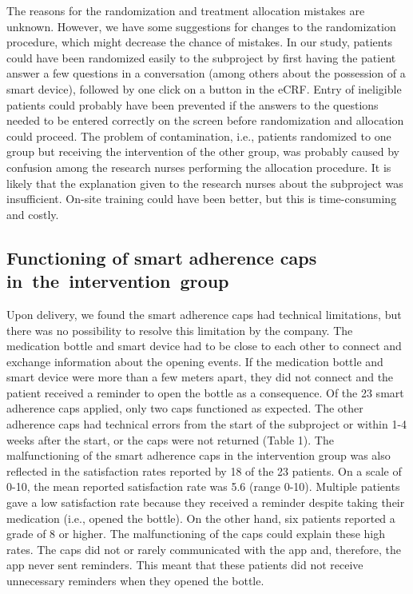 \documentclass[twocolumn, issue, empirical, authordate]{jote-new-article}
\begin{document}
 The reasons for the randomization and treatment allocation mistakes are unknown. However, we have some suggestions for changes to the randomization procedure, which might decrease the chance of mistakes. In our study, patients could have been randomized easily to the subproject by first having the patient answer a few questions in a conversation (among others about the possession of a smart device), followed by one click on a button in the eCRF. Entry of ineligible patients could probably have been prevented if the answers to the questions needed to be entered correctly on the screen before randomization and allocation could proceed.
 The problem of contamination, i.e., patients randomized to one group but receiving the intervention of the other group, was probably caused by confusion among the research nurses performing the allocation procedure.
It is likely that the explanation given to the research nurses about the subproject was insufficient. On-site training could have been better, but this is time-consuming and costly.

\subsection{Functioning of smart adherence caps in~the~intervention~group}

 Upon delivery, we found the smart adherence caps had technical limitations, but there was no possibility to resolve this limitation by the company. The medication bottle and smart device had to be close to each other to connect and exchange information about the opening events.
If the medication bottle and smart device were more than a few meters apart, they did not connect and the patient received a reminder to open the bottle as a consequence.
 Of the 23 smart adherence caps applied, only two caps functioned as expected. The other adherence caps had technical errors from the start of the subproject or within 1-4 weeks after the start, or the caps were not returned (Table 1).
 The malfunctioning of the smart adherence caps in the intervention group was also reflected in the satisfaction rates reported by 18 of the 23 patients. On a scale of 0-10, the mean reported satisfaction rate was 5.6 (range 0-10). Multiple patients gave a low satisfaction rate because they received a reminder despite taking their medication (i.e., opened the bottle). On the other hand, six patients reported a grade of 8 or higher. The malfunctioning of the caps could explain these high rates.
The caps did not or rarely communicated with the app and, therefore, the app never sent reminders. This meant that these patients did not receive unnecessary reminders when they opened the bottle.
\end{document}
